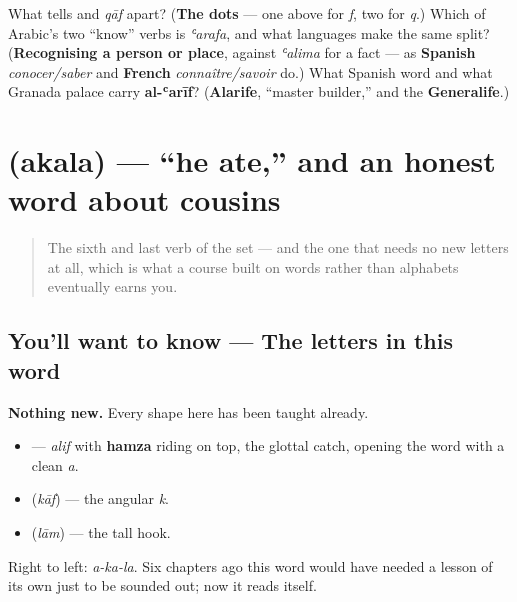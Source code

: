 \begin{tcolorbox}[breakable,colback=teal!4,colframe=teal!35!black,title={Before you move on}]
What tells \textbf{} and \emph{qāf} apart? (\textbf{The dots} — one above for \emph{f}, two for \emph{q}.) Which of Arabic's two \textquotedblleft{}know\textquotedblright{} verbs is \emph{ʿarafa}, and what languages make the same split? (\textbf{Recognising a person or place}, against \emph{ʿalima} for a fact — as \textbf{Spanish} \emph{conocer/saber} and \textbf{French} \emph{connaître/savoir} do.) What Spanish word and what Granada palace carry \textbf{al-ʿarīf}? (\textbf{Alarife}, \textquotedblleft{}master builder,\textquotedblright{} and the \textbf{Generalife}.)
\end{tcolorbox}
\section[\texorpdfstring{\ar{أكل} (akala)}{أكل (akala)}]{ (akala) — \textquotedblleft{}he ate,\textquotedblright{} and an honest word about cousins}

\label{lesson:AR-C30-akala}



\begin{quote}
The sixth and last verb of the set — and the one that needs no new letters at all, which is what a course built on words rather than alphabets eventually earns you.
\end{quote}

\subsection*{You'll want to know — The letters in this word}
\textbf{Nothing new.} Every shape here has been taught already.

\begin{itemize}
\raggedright
  \item \textbf{} — \emph{alif} with \textbf{hamza} riding on top, the glottal catch, opening the word with a clean \emph{a}.
  \item \textbf{} (\emph{kāf}) — the angular \emph{k}.
  \item \textbf{} (\emph{lām}) — the tall hook.
\end{itemize}

Right to left: \emph{a-ka-la}. Six chapters ago this word would have needed a lesson of its own just to be sounded out; now it reads itself.

